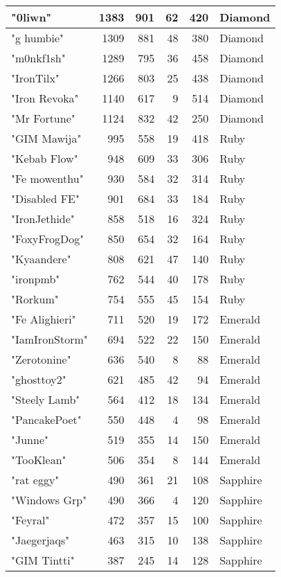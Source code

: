 \documentclass{article}
\begin{document}
\begin{table}[htbp]
\begin{tabular}{|l|r|r|r|r|l|}
"0liwn" & 1383 & 901 & 62 & 420 & Diamond \\ \hline
"g humbie" & 1309 & 881 & 48 & 380 & Diamond \\ \hline
"m0nkf1sh" & 1289 & 795 & 36 & 458 & Diamond \\ \hline
"IronTilx" & 1266 & 803 & 25 & 438 & Diamond \\ \hline
"Iron Revoka" & 1140 & 617 & 9 & 514 & Diamond \\ \hline
"Mr Fortune" & 1124 & 832 & 42 & 250 & Diamond \\ \hline
"GIM Mawija" & 995 & 558 & 19 & 418 & Ruby \\ \hline
"Kebab Flow" & 948 & 609 & 33 & 306 & Ruby \\ \hline
"Fe mowenthu" & 930 & 584 & 32 & 314 & Ruby \\ \hline
"Disabled FE" & 901 & 684 & 33 & 184 & Ruby \\ \hline
"IronJethide" & 858 & 518 & 16 & 324 & Ruby \\ \hline
"FoxyFrogDog" & 850 & 654 & 32 & 164 & Ruby \\ \hline
"Kyaandere" & 808 & 621 & 47 & 140 & Ruby \\ \hline
"ironpmb" & 762 & 544 & 40 & 178 & Ruby \\ \hline
"Rorkum" & 754 & 555 & 45 & 154 & Ruby \\ \hline
"Fe Alighieri" & 711 & 520 & 19 & 172 & Emerald \\ \hline
"IamIronStorm" & 694 & 522 & 22 & 150 & Emerald \\ \hline
"Zerotonine" & 636 & 540 & 8 & 88 & Emerald \\ \hline
"ghosttoy2" & 621 & 485 & 42 & 94 & Emerald \\ \hline
"Steely Lamb" & 564 & 412 & 18 & 134 & Emerald \\ \hline
"PancakePoet" & 550 & 448 & 4 & 98 & Emerald \\ \hline
"Junne" & 519 & 355 & 14 & 150 & Emerald \\ \hline
"TooKlean" & 506 & 354 & 8 & 144 & Emerald \\ \hline
"rat eggy" & 490 & 361 & 21 & 108 & Sapphire \\ \hline
"Windows Grp" & 490 & 366 & 4 & 120 & Sapphire \\ \hline
"Feyral" & 472 & 357 & 15 & 100 & Sapphire \\ \hline
"Jaegerjaqs" & 463 & 315 & 10 & 138 & Sapphire \\ \hline
"GIM Tintti" & 387 & 245 & 14 & 128 & Sapphire \\ \hline

\end{tabular}
\end{table}
\end{document}
